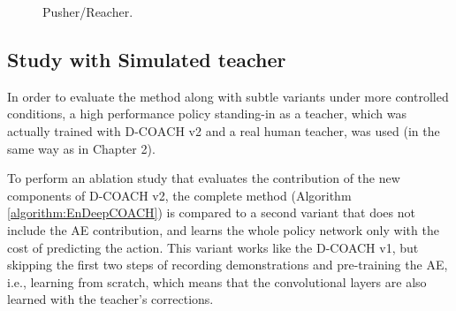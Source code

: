 \begin{figure}[h]
\centering
{} 
\hspace{0.25cm}
\hspace{0.25cm}
\hspace{0.25cm}
\caption{Pusher/Reacher.} 
\label{fig:PusherReacher} 
\end{figure}


\subsection{Study with Simulated teacher}
In order to evaluate the method along with subtle variants under more controlled conditions, a high performance policy standing-in as a teacher, which was actually trained with $\text{D-COACH}$ v2 and a real human teacher, was used (in the same way as in Chapter 2).

To perform an ablation study that evaluates the contribution of the new components of D-COACH v2, the complete method (Algorithm \ref{algorithm:EnDeepCOACH}) is compared to a second variant that does not include the AE contribution, and learns the whole policy network only with the cost of predicting the action. This variant  works like the D-COACH v1, but skipping the first two steps of recording demonstrations and pre-training the AE, i.e., learning from scratch, which means that the convolutional layers are also learned with the teacher's corrections.


